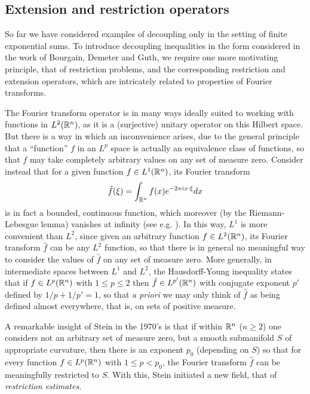 \documentclass[brochure,english,12pt]{bourbaki}%
\begin{document}
\subsection{Extension and restriction operators}
So far we have considered examples of decoupling only in the setting of finite exponential sums. To introduce decoupling inequalities in the form considered in the work of Bourgain, Demeter and Guth, we require one more motivating principle, that of restriction problems, and the corresponding restriction and extension operators, which are intricately related to properties of Fourier transforms. 

The Fourier transform operator is in many ways ideally suited to working with functions in $L^2(\mathbb{R}^n)$, as it is a (surjective)  unitary operator on this Hilbert space. But there is a way in which an inconvenience arises, due to the general principle that a ``function'' $f$ in an $L^p$ space is actually an equivalence class of functions, so that $f$ may take completely arbitrary values on any set of measure zero. 
Consider instead that for a given function $f \in L^1(\mathbb{R}^n)$, its Fourier transform 
\[ \hat{f}(\xi) = \int_{\mathbb{R}^n} f(x) e^{-2\pi i x\cdot \xi}dx\]
is in fact a bounded, continuous function, which moreover (by the Riemann-Lebesgue lemma) vanishes at infinity (see e.g. \cite{SteinWeiss}). In this way, $L^1$ is more convenient than $L^2$, since given an arbitrary function $f \in L^2(\mathbb{R}^n)$, its Fourier transform  $\hat{f}$ can be any  $L^2$ function, so that there is in general no meaningful way to  consider the values of $\hat{f}$ on any set of measure zero.  More generally, in  intermediate spaces between $L^1$ and $L^2$, the Hausdorff-Young inequality states that if $f \in L^p(\mathbb{R}^n)$ with $1 \leq p \leq 2$ then $ \hat{f} \in L^{p'}(\mathbb{R}^n)$ with conjugate exponent $p'$ defined by $1/p + 1/p'=1$, so that \emph{a priori} we may only think of $\hat{f}$ as being defined almost everywhere, that is, on sets of positive measure. 

A remarkable insight of Stein in the 1970's is that if within $\mathbb{R}^n$ ($n \geq 2$) one considers not an arbitrary set of measure zero, but a smooth submanifold $S$ of appropriate curvature, then there is an exponent $p_0$ (depending on $S$) so that for every function $f \in L^p(\mathbb{R}^n)$ with $1 \leq p < p_0$, the Fourier transform $\hat{f}$ can be meaningfully restricted to $S$. With this, Stein \cite{Stein79} initiated a new field, that of \emph{restriction estimates}.
\end{document}
